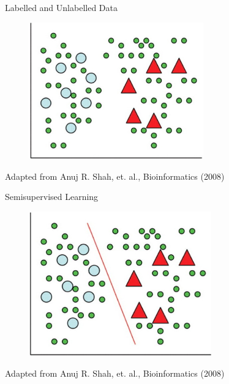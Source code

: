 \documentclass[utf8, a4paper]{beamer}
\begin{document}
\begin{frame} {Labelled and Unlabelled Data} 

\vspace{-0.5cm}

\begin{figure}
\centering
  \includegraphics[trim={0cm 0cm 0cm 0cm},clip, width=0.67\textwidth]{images/topright}
\end{figure}

\vspace{-0.3cm}

\tiny{Adapted from Anuj R. Shah, et. al.,  Bioinformatics (2008) }

\end{frame}

\begin{frame} {Semisupervised Learning} 

\vspace{-0.9cm}

\begin{figure}
\centering
  \includegraphics[trim={0cm 0cm 0cm 0cm},clip, width=0.7\textwidth]{images/bottomright}
\end{figure}
\tiny{Adapted from Anuj R. Shah, et. al.,  Bioinformatics (2008) }

\end{frame}
\end{document}
